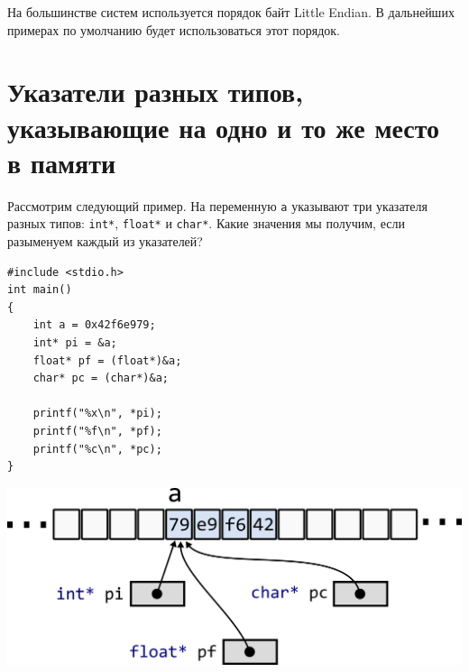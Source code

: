 \documentclass{article}
\begin{document}
На большинстве систем используется порядок байт Little Endian. В дальнейших примерах по умолчанию будет использоваться этот порядок.




\newpage
\section*{Указатели разных типов, указывающие на одно и то же место в памяти}

Рассмотрим следующий пример. На переменную \texttt{a} указывают три указателя разных типов: \texttt{int*}, \texttt{float*} и \texttt{char*}. Какие значения мы получим, если разыменуем каждый из указателей?

\begin{minipage}{0.4\textwidth}
\begin{lstlisting}
#include <stdio.h>
int main() 
{
    int a = 0x42f6e979;
    int* pi = &a;
    float* pf = (float*)&a;
    char* pc = (char*)&a;
    
    printf("%x\n", *pi);
    printf("%f\n", *pf);
    printf("%c\n", *pc);
}
\end{lstlisting}
\end{minipage}
\begin{minipage}{0.5\textwidth}
\begin{center}
\includegraphics[scale=0.65]{../images/memory_int_char_pointer.png}
\end{center}
\end{minipage}
\end{document}
